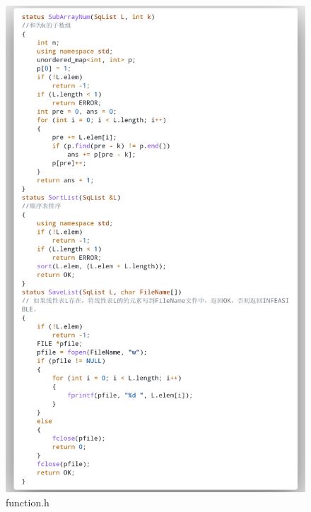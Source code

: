 \documentclass[supercite]{Experimental_Report}
\theoremstyle{definition}
\begin{document}
\begin{figure}[htb]
	\begin{center}
		\includegraphics[scale=0.30]{images/3-6.png}
		\caption{function.h}
		\label{fig3-6}
	\end{center}
\end{figure}
\end{document}
